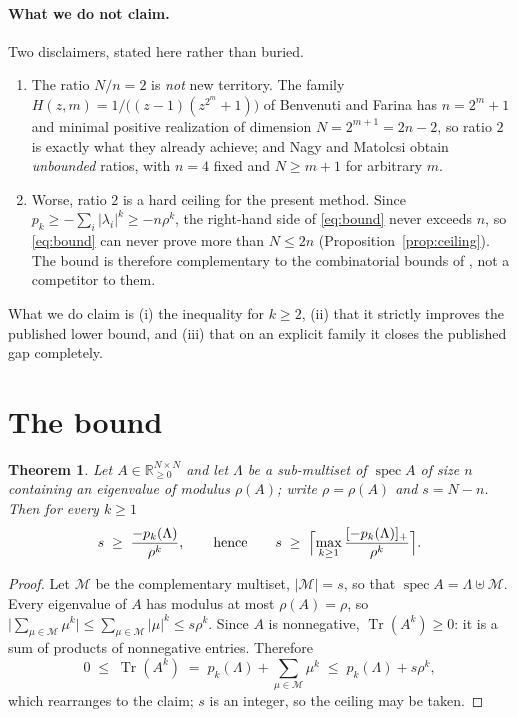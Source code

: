 \documentclass[11pt]{article}
\theoremstyle{plain}
\newtheorem{theorem}{Theorem}
\theoremstyle{remark}
\newcommand{\R}{\mathbb{R}}
\newcommand{\M}{\mathcal{M}}
\newcommand{\Tr}{\operatorname{Tr}}
\begin{document}
\paragraph{What we do not claim.} Two disclaimers, stated here rather than buried.
\begin{enumerate}
\item[(a)] The ratio $N/n=2$ is \emph{not} new territory. The family
$H(z,m)=1/\bigl((z-1)(z^{2^{m}}+1)\bigr)$ of Benvenuti and Farina \cite{BF99} has
$n=2^{m}+1$ and minimal positive realization of dimension $N=2^{m+1}=2n-2$, so ratio $2$ is
exactly what they already achieve; and Nagy and Matolcsi \cite{NM03} obtain \emph{unbounded}
ratios, with $n=4$ fixed and $N\ge m+1$ for arbitrary $m$.
\item[(b)] Worse, ratio $2$ is a hard ceiling for the present method.
Since $p_k\ge-\sum_i|\lambda_i|^{k}\ge-n\rho^{k}$, the right-hand side of \eqref{eq:bound}
never exceeds $n$, so \eqref{eq:bound} can never prove more than $N\le 2n$
(Proposition~\ref{prop:ceiling}). The bound is therefore complementary to the combinatorial
bounds of \cite{NM03}, not a competitor to them.
\end{enumerate}
What we do claim is (i) the inequality for $k\ge2$, (ii) that it strictly improves the
published lower bound, and (iii) that on an explicit family it closes the published gap
completely.

\section{The bound}\label{sec:bound}

\begin{theorem}\label{thm:main}
Let $A\in\R_{\ge0}^{N\times N}$ and let $\Lambda$ be a sub-multiset of $\operatorname{spec}A$
of size $n$ containing an eigenvalue of modulus $\rho(A)$; write $\rho=\rho(A)$ and
$s=N-n$. Then for every $k\ge1$
\[
s\;\ge\;\frac{-p_k(\Lambda)}{\rho^{k}},
\qquad\text{hence}\qquad
s\;\ge\;\Bigl\lceil\max_{k\ge1}\frac{[-p_k(\Lambda)]_+}{\rho^{k}}\Bigr\rceil .
\]
\end{theorem}

\begin{proof}
Let $\M$ be the complementary multiset, $|\M|=s$, so that
$\operatorname{spec}A=\Lambda\uplus\M$. Every eigenvalue of $A$ has modulus at most
$\rho(A)=\rho$, so $\bigl|\sum_{\mu\in\M}\mu^{k}\bigr|\le\sum_{\mu\in\M}|\mu|^{k}\le
s\rho^{k}$. Since $A$ is nonnegative, $\Tr(A^{k})\ge0$: it is a sum of products of
nonnegative entries. Therefore
\[
0\;\le\;\Tr(A^{k})\;=\;p_k(\Lambda)+\sum_{\mu\in\M}\mu^{k}\;\le\;p_k(\Lambda)+s\rho^{k},
\]
which rearranges to the claim; $s$ is an integer, so the ceiling may be taken.
\end{proof}
\end{document}
